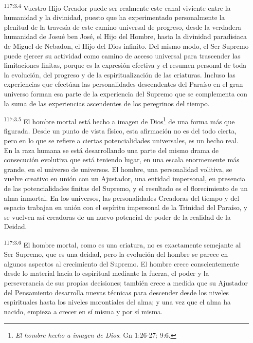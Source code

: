 \documentclass[twoside, 11pt]{book}
\begin{document}
\par
\textsuperscript{117:3.4} Vuestro Hijo Creador puede ser realmente este canal viviente entre la humanidad y la divinidad, puesto que ha experimentado personalmente la plenitud de la travesía de este camino universal de progreso, desde la verdadera humanidad de Josué ben José, el Hijo del Hombre, hasta la divinidad paradisiaca de Miguel de Nebadon, el Hijo del Dios infinito. Del mismo modo, el Ser Supremo puede ejercer su actividad como camino de acceso universal para trascender las limitaciones finitas, porque es la expresión efectiva y el resumen personal de toda la evolución, del progreso y de la espiritualización de las criaturas. Incluso las experiencias que efectúan las personalidades descendentes del Paraíso en el gran universo forman esa parte de la experiencia del Supremo que se complementa con la suma de las experiencias ascendentes de los peregrinos del tiempo.

\par
\textsuperscript{117:3.5} El hombre mortal está hecho a imagen de Dios\footnote{\textit{El hombre hecho a imagen de Dios}: Gn 1:26-27; 9:6.} de una forma más que figurada. Desde un punto de vista físico, esta afirmación no es del todo cierta, pero en lo que se refiere a ciertas potencialidades universales, es un hecho real. En la raza humana se está desarrollando una parte del mismo drama de consecución evolutiva que está teniendo lugar, en una escala enormemente más grande, en el universo de universos. El hombre, una personalidad volitiva, se vuelve creativo en unión con un Ajustador, una entidad impersonal, en presencia de las potencialidades finitas del Supremo, y el resultado es el florecimiento de un alma inmortal. En los universos, las personalidades Creadoras del tiempo y del espacio trabajan en unión con el espíritu impersonal de la Trinidad del Paraíso, y se vuelven así creadoras de un nuevo potencial de poder de la realidad de la Deidad.

\par
\textsuperscript{117:3.6} El hombre mortal, como es una criatura, no es exactamente semejante al Ser Supremo, que es una deidad, pero la evolución del hombre se parece en algunos aspectos al crecimiento del Supremo. El hombre crece conscientemente desde lo material hacia lo espiritual mediante la fuerza, el poder y la perseverancia de sus propias decisiones; también crece a medida que su Ajustador del Pensamiento desarrolla nuevas técnicas para descender desde los niveles espirituales hasta los niveles morontiales del alma; y una vez que el alma ha nacido, empieza a crecer en sí misma y por sí misma.
\end{document}
